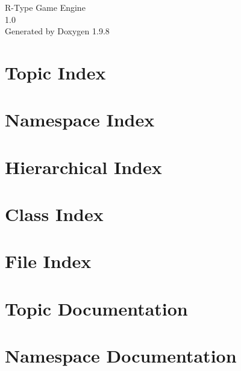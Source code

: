 \documentclass[twoside]{book}
\newcommand{\+}{\discretionary{\mbox{\scriptsize$\hookleftarrow$}}{}{}}
\newcommand{\clearemptydoublepage}{%
    \newpage{\pagestyle{empty}\cleardoublepage}%
  }
\begin{document}
  \raggedbottom
    \hypersetup{pageanchor=false,
                bookmarksnumbered=true,
                pdfencoding=unicode
               }
  \begin{titlepage}
  \vspace*{7cm}
  \begin{center}%
  {\Large R-\/\+Type Game Engine}\\
  [1ex]\large 1.\+0 \\
  \vspace*{1cm}
  {\large Generated by Doxygen 1.9.8}\\
  \end{center}
  \end{titlepage}
  \clearemptydoublepage
  \tableofcontents
  \clearemptydoublepage
  \hypersetup{pageanchor=true}


\chapter{Topic Index}

\chapter{Namespace Index}

\chapter{Hierarchical Index}

\chapter{Class Index}

\chapter{File Index}

\chapter{Topic Documentation}

\chapter{Namespace Documentation}


\end{document}
